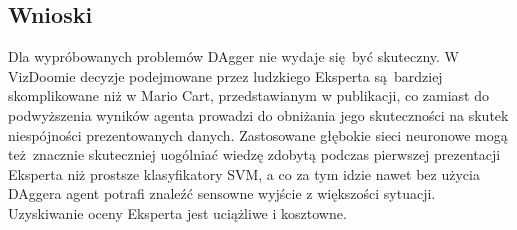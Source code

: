 \subsection{Wnioski}
Dla wypróbowanych problemów DAgger nie wydaje się być skuteczny. W VizDoomie decyzje podejmowane przez ludzkiego Eksperta są bardziej skomplikowane niż w Mario Cart, przedstawianym w publikacji, co zamiast do podwyższenia wyników agenta prowadzi do obniżania jego skuteczności na skutek niespójności prezentowanych danych. Zastosowane głębokie sieci neuronowe mogą też znacznie skuteczniej uogólniać wiedzę zdobytą podczas pierwszej prezentacji Eksperta niż prostsze klasyfikatory SVM, a co za tym idzie nawet bez użycia DAggera agent potrafi znaleźć sensowne wyjście z większości sytuacji. Uzyskiwanie oceny Eksperta jest uciążliwe i kosztowne.

